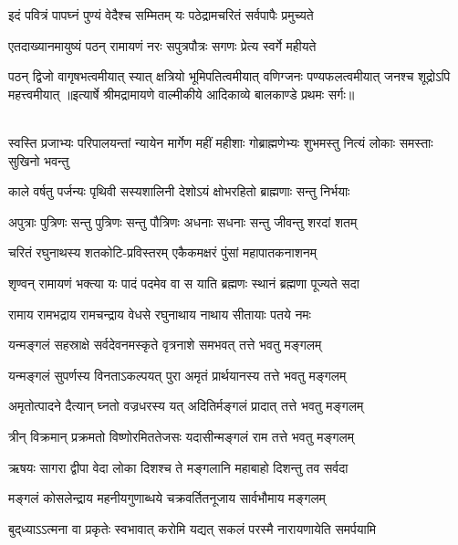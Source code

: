\twolineshloka
{इदं पवित्रं पापघ्नं पुण्यं वेदैश्च सम्मितम्}
{यः पठेद्रामचरितं सर्वपापैः प्रमुच्यते}%

\twolineshloka
{एतदाख्यानमायुष्यं पठन् रामायणं नरः}
{सपुत्रपौत्रः सगणः प्रेत्य स्वर्गे महीयते}%

\fourlineindentedshloka
{पठन् द्विजो वागृषभत्वमीयात्}
{स्यात् क्षत्रियो भूमिपतित्वमीयात्}
{वणिग्जनः पण्यफलत्वमीयात्}
{जनश्च शूद्रोऽपि महत्त्वमीयात्}%
{॥इत्यार्षे श्रीमद्रामायणे वाल्मीकीये आदिकाव्ये बालकाण्डे प्रथमः सर्गः॥}

\mbox{}\\
\resetShloka
{}
\fourlineindentedshloka
{स्वस्ति प्रजाभ्यः परिपालयन्तां}
{न्यायेन मार्गेण महीं महीशाः}
{गोब्राह्मणेभ्यः शुभमस्तु नित्यं}
{लोकाः समस्ताः सुखिनो भवन्तु}

\twolineshloka
{काले वर्षतु पर्जन्यः पृथिवी सस्यशालिनी}
{देशोऽयं क्षोभरहितो ब्राह्मणाः सन्तु निर्भयाः}

\twolineshloka
{अपुत्राः पुत्रिणः सन्तु पुत्रिणः सन्तु पौत्रिणः}
{अधनाः सधनाः सन्तु जीवन्तु शरदां शतम्}

\twolineshloka
{चरितं रघुनाथस्य शतकोटि-प्रविस्तरम्}
{एकैकमक्षरं पुंसां महापातकनाशनम्}

\twolineshloka
{शृण्वन् रामायणं भक्त्या यः पादं पदमेव वा}
{स याति ब्रह्मणः स्थानं ब्रह्मणा पूज्यते सदा}

\twolineshloka
{रामाय रामभद्राय रामचन्द्राय वेधसे}
{रघुनाथाय नाथाय सीतायाः पतये नमः}

\twolineshloka
{यन्मङ्गलं सहस्राक्षे सर्वदेवनमस्कृते}
{वृत्रनाशे समभवत् तत्ते भवतु मङ्गलम्}

\twolineshloka
{यन्मङ्गलं सुपर्णस्य विनताऽकल्पयत् पुरा}
{अमृतं प्रार्थयानस्य तत्ते भवतु मङ्गलम्}

\twolineshloka
{अमृतोत्पादने दैत्यान् घ्नतो वज्रधरस्य यत्}
{अदितिर्मङ्गलं प्रादात् तत्ते भवतु मङ्गलम्}

\twolineshloka
{त्रीन् विक्रमान् प्रक्रमतो विष्णोरमिततेजसः}
{यदासीन्मङ्गलं राम तत्ते भवतु मङ्गलम्}

\twolineshloka
{ऋषयः सागरा द्वीपा वेदा लोका दिशश्च ते}
{मङ्गलानि महाबाहो दिशन्तु तव सर्वदा}

\twolineshloka
{मङ्गलं कोसलेन्द्राय महनीयगुणाब्धये}
{चक्रवर्तितनूजाय सार्वभौमाय मङ्गलम्}

{बुद्‌ध्याऽऽत्मना वा प्रकृतेः स्वभावात्}
{करोमि यद्यत् सकलं परस्मै}
{नारायणायेति समर्पयामि}\nopagebreak[4]
